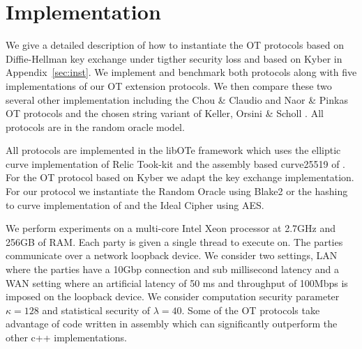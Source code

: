 \section{Implementation}\label{sec:impl}

We give a detailed description of how to instantiate the OT protocols based on Diffie-Hellman key exchange under tigther security loss and based on Kyber in Appendix~\ref{sec:inst}. We implement and benchmark both protocols along with five implementations of our OT extension protocols. We then compare these two several other implementation including the Chou \& Claudio \cite{LC:ChoOrl15} and Naor \& Pinkas \cite{SODA:NaoPin01} OT protocols and the chosen string variant of Keller, Orsini \& Scholl \cite{C:KelOrsSch15}.  All protocols are in the random oracle model.

All protocols are implemented in the libOTe framework\cite{libOTe} which uses the elliptic curve implementation of Relic Took-kit\cite{relic} and the assembly based curve25519 of \cite{LC:ChoOrl15,simplest}. For the OT protocol based on Kyber we adapt the \cite{NISTPQC-R1:CRYSTALS-KYBER17} key exchange implementation. For our protocol we instantiate the Random Oracle using Blake2 or the hashing to curve implementation of \cite{relic} and the Ideal Cipher using AES.

We perform experiments on a multi-core Intel Xeon processor at 2.7GHz and 256GB of RAM. Each party is given a single thread to execute on. The parties communicate over a network loopback device. We consider two settings, LAN where the parties have a 10Gbp connection and sub millisecond latency and a WAN setting where an artificial latency of 50 ms and throughput of 100Mbps is imposed on the loopback device. We consider computation security parameter $\kappa=128$ and statistical security of $\lambda=40$.  Some of the OT protocols take advantage of code written in assembly which can significantly outperform the other c++ implementations.
\newcommand{\mr}[2]{\multirow{#1}{*}{#2}}

